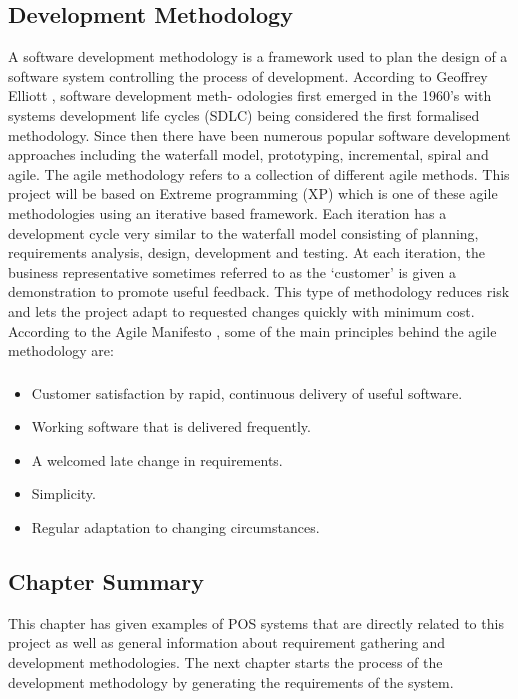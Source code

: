 \documentclass[12pt,a4paper]{article}
\begin{document}
\subsection{Development Methodology}
	A software development methodology is a framework used to plan the design of a software system
controlling the process of development. According to Geoffrey Elliott \cite{Ref:2}, software development meth-
odologies first emerged in the 1960’s with systems development life cycles (SDLC) being considered
the first formalised methodology. Since then there have been numerous popular software development
approaches including the waterfall model, prototyping, incremental, spiral and agile.
The agile methodology refers to a collection of different agile methods. This project will be based
on Extreme programming (XP) which is one of these agile methodologies using an iterative based
framework. Each iteration has a development cycle very similar to the waterfall model consisting
of planning, requirements analysis, design, development and testing. At each iteration, the business
representative sometimes referred to as the ‘customer’ is given a demonstration to promote useful
feedback. This type of methodology reduces risk and lets the project adapt to requested changes
quickly with minimum cost.\\
According to the Agile Manifesto \cite{Ref:3}, some of the main principles behind the agile methodology
are:
	\subsubsection{}
		\begin{itemize}
			\item Customer satisfaction by rapid, continuous delivery of useful software.
			\item Working software that is delivered frequently.
			\item A welcomed late change in requirements.
			\item Simplicity.
			\item Regular adaptation to changing circumstances.
		\end{itemize}

\subsection{Chapter Summary}
	
	This chapter has given examples of POS systems that are directly related to this project as well as
general information about requirement gathering and development methodologies. The next chapter
starts the process of the development methodology by generating the requirements of the system.
\newpage
\end{document}
